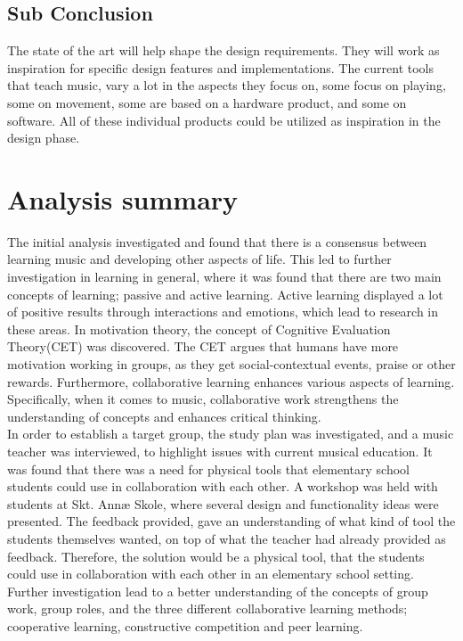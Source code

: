 \subsection*{Sub Conclusion}
The state of the art will help shape the design requirements. They will work as inspiration for specific design features and implementations. The current tools that teach music, vary a lot in the aspects they focus on, some focus on playing, some on movement, some are based on a hardware product, and some on software. All of these individual products could be utilized as inspiration in the design phase.

\section{Analysis summary}
The initial analysis investigated and found that there is a consensus between learning music and developing other aspects of life. This led to further investigation in learning in general, where it was found that there are two main concepts of learning; passive and active learning. Active learning displayed a lot of positive results through interactions and emotions, which lead to research in these areas. In motivation theory, the concept of Cognitive Evaluation Theory(CET) was discovered. The CET argues that humans have more motivation working in groups, as they get social-contextual events, praise or other rewards. Furthermore, collaborative learning enhances various aspects of learning. Specifically, when it comes to music, collaborative work strengthens the understanding of concepts and enhances critical thinking.\\

In order to establish a target group, the study plan was investigated, and a music teacher was interviewed, to highlight issues with current musical education. It was found that there was a need for physical tools that elementary school students could use in collaboration with each other. A workshop was held with students at Skt. Annæ Skole, where several design and functionality ideas were presented. The feedback provided, gave an understanding of what kind of tool the students themselves wanted, on top of what the teacher had already provided as feedback. Therefore, the solution would be a physical tool, that the students could use in collaboration with each other in an elementary school setting.\\

Further investigation lead to a better understanding of the concepts of group work, group roles, and the three different collaborative learning methods; cooperative learning, constructive competition and peer learning.\\


